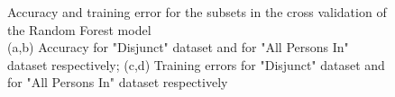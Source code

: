 \documentclass[conference]{IEEEtran}
\begin{document}

\begin{figure}[ht!]
    \centering

    \quad
    \quad
    
    \quad
    \quad

    \caption{
        \color{baptiste}
        Accuracy and training error for the subsets in the cross validation of the Random Forest model \\ 
        (a,b) Accuracy for "Disjunct" dataset and for "All Persons In" dataset respectively;
        (c,d) Training errors for "Disjunct" dataset and for "All Persons In" dataset respectively
    }
    \label{fig:hyper:cv_results}
\end{figure}
\end{document}
